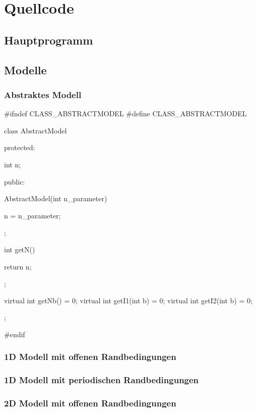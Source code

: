 \chapter{Quellcode}

\section{Hauptprogramm}

\section{Modelle}

\subsection{Abstraktes Modell}

\begin{cppcode}[caption={Classes/Model/AbstractModel.cpp},label=code:AbstractModel]
#ifndef CLASS_ABSTRACTMODEL
#define CLASS_ABSTRACTMODEL

class AbstractModel {

  protected:
  
    int n;

  public:

    AbstractModel(int n_parameter) {

      n = n_parameter;
        
    };

    int getN() {
    
      return n;
    
    };

    virtual int getNb() = 0;
    virtual int getI1(int b) = 0;
    virtual int getI2(int b) = 0;
    
};

#endif
\end{cppcode}

\subsection{1D Modell mit offenen Randbedingungen}

\subsection{1D Modell mit periodischen Randbedingungen}

\subsection{2D Modell mit offenen Randbedingungen}

